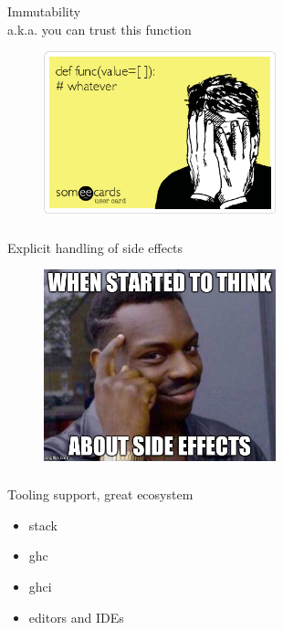 \documentclass[usenames,dvipsnames, 18pt, compress, aspectratio=169]{beamer}
\begin{document}
\begin{frame}
    \frametitle{}
    \begin{center}
    Immutability\\
    a.k.a. you can trust this function
    \begin{figure}
        \includegraphics[width=0.6\textwidth,center]{immutability.png}
    \end{figure}
    \end{center}
\end{frame}

\begin{frame}
    \frametitle{}
    \begin{center}
    Explicit handling of side effects
    \begin{figure}
        \includegraphics[width=0.6\textwidth,center]{side_effects.jpg}
    \end{figure}
    \end{center}
\end{frame}

\begin{frame}
    \frametitle{}
    \begin{center}
    Tooling support, great ecosystem
    \begin{itemize}[label={\MVRightarrow}]
        \item stack
        \item ghc
        \item ghci
        \item editors and IDEs
    \end{itemize}
    \end{center}
\end{frame}
\end{document}
